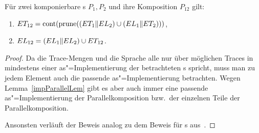 \begin{Satz}
  Für zwei komponierbare \MEIO{}s $P_1,P_2$ und ihre Komposition $P_{12}$ gilt:
  \begin{enumerate}
    \item $ET _{12} = \mathrm{cont} (\mathrm{prune} ((ET _1\|EL _2) \cup (EL _1\|ET
      _2)))$,
    \item $EL _{12} = (EL _1\|EL _2) \cup ET _{12}$.
  \end{enumerate}
\end{Satz}
\begin{proof}
  Da die Trace-Mengen und die Sprache alle nur über möglichen Traces in
  mindestens einer as"=Implementierung der betrachteten \MEIO{}s spricht, muss
  man zu jedem Element auch die passende as"=Implementierung betrachten. Wegen
  Lemma~\ref{impParallelLem} gibt es aber auch immer eine passende
  as"=Implementierung der Parallelkomposition bzw.\ der einzelnen Teile der
  Parallelkomposition.



  Ansonsten verläuft der Beweis analog zu dem Beweis für
  \EIO{}s aus~\cite{Schinko2016BA}.


\end{proof}

